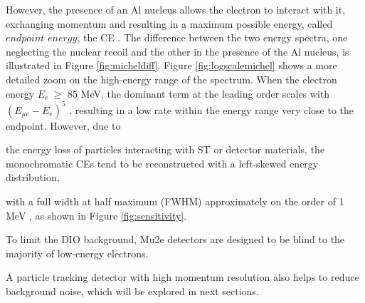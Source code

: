 However, the presence of an Al nucleus allows the electron to 
interact with it, exchanging momentum and resulting in a maximum possible energy, called 
$endpoint$ $energy$,  the CE .
The difference between the two energy spectra, one 
neglecting the nuclear recoil and the 
other in the presence of the Al nucleus, is illustrated in Figure \ref{fig:micheldiff}. 
Figure \ref{fig:logscalemichel} shows a more detailed zoom on the high-energy 
range of the spectrum. When the electron energy $E_e \ \geq$ 85 MeV, the dominant term 
at the leading order scales with $(E_{\mu e} - E_e)^5$ \cite{PhysRevD.84.013006}, 
resulting in a low rate within the energy range very close to the endpoint. However,
 due to 

the energy  loss of particles  interacting with ST or detector materials,
the {\red monochromatic CEs} tend to be reconstructed with a left-skewed energy distribution,

with a full width at half maximum (FWHM) approximately on the order of 1 MeV 
\cite{gaponenko}, as shown in Figure \ref{fig:sensitivity}.

{\red To limit the DIO background, Mu2e detectors are 
designed to be blind to the majority of low-energy electrons.}

{\red A particle 
tracking detector with high momentum resolution also helps to reduce background 
noise, which will be explored in next sections.}



